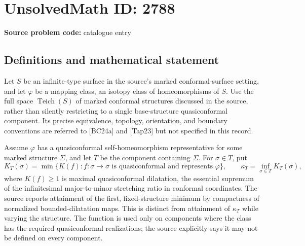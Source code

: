 \documentclass[11pt]{article}
\begin{document}
\section*{UnsolvedMath ID: 2788}
\textbf{Source problem code:} catalogue entry
\subsection{Definitions and mathematical statement}
Let $S$ be an infinite-type surface in the source's marked conformal-surface setting, and let $\varphi$ be a mapping class, an isotopy class of homeomorphisms of $S$. Use the full space $\operatorname{Teich}(S)$ of marked conformal structures discussed in the source, rather than silently restricting to a single base-structure quasiconformal component. Its precise equivalence, topology, orientation, and boundary conventions are referred to [BC24a] and [Tap23] but not specified in this record.

Assume $\varphi$ has a quasiconformal self-homeomorphism representative for some marked structure $\Sigma$, and let $T$ be the component containing $\Sigma$. For $\sigma\in T$, put
\[K_T(\sigma)=\min\{K(f):f:\sigma\to\sigma\text{ is quasiconformal and represents }\varphi\},\qquad \kappa_T=\inf_{\sigma\in T}K_T(\sigma),\]
where $K(f)\geq1$ is maximal quasiconformal dilatation, the essential supremum of the infinitesimal major-to-minor stretching ratio in conformal coordinates. The source reports attainment of the first, fixed-structure minimum by compactness of normalized bounded-dilatation maps. This is distinct from attainment of $\kappa_T$ while varying the structure. The function is used only on components where the class has the required quasiconformal realizations; the source explicitly says it may not be defined on every component.
\end{document}
